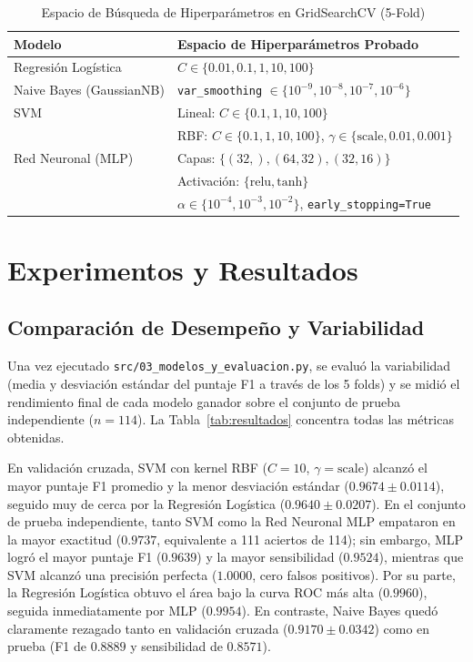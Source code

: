 \documentclass[conference]{IEEEtran}
\begin{document}
\begin{table}[t]
    \centering
    \caption{Espacio de Búsqueda de Hiperparámetros en GridSearchCV (5-Fold)}
    \label{tab:espacio_busqueda}
    \renewcommand{\arraystretch}{1.2}
    \begin{tabular}{@{}p{2.3cm}p{5.7cm}@{}}
        \toprule
        \textbf{Modelo} & \textbf{Espacio de Hiperparámetros Probado} \\
        \midrule
        Regresión Logística & $C \in \{0.01, 0.1, 1, 10, 100\}$ \\
        \addlinespace
        Naive Bayes (GaussianNB) & \texttt{var\_smoothing} $\in \{10^{-9}, 10^{-8}, 10^{-7}, 10^{-6}\}$ \\
        \addlinespace
        SVM & Lineal: $C \in \{0.1, 1, 10, 100\}$ \\
            & RBF: $C \in \{0.1, 1, 10, 100\}$, $\gamma \in \{\text{scale}, 0.01, 0.001\}$ \\
        \addlinespace
        Red Neuronal (MLP) & Capas: $\{(32,), (64,32), (32,16)\}$ \\
                           & Activación: $\{\text{relu}, \text{tanh}\}$ \\
                           & $\alpha \in \{10^{-4}, 10^{-3}, 10^{-2}\}$, \texttt{early\_stopping=True} \\
        \bottomrule
    \end{tabular}
\end{table}

\section{Experimentos y Resultados}

\subsection{Comparación de Desempeño y Variabilidad}

Una vez ejecutado \texttt{src/03\_modelos\_y\_evaluacion.py}, se evaluó la variabilidad (media y desviación estándar del puntaje F1 a través de los 5 folds) y se midió el rendimiento final de cada modelo ganador sobre el conjunto de prueba independiente ($n = 114$). La Tabla~\ref{tab:resultados} concentra todas las métricas obtenidas.

En validación cruzada, SVM con kernel RBF ($C = 10$, $\gamma = \text{scale}$) alcanzó el mayor puntaje F1 promedio y la menor desviación estándar ($0.9674 \pm 0.0114$), seguido muy de cerca por la Regresión Logística ($0.9640 \pm 0.0207$). En el conjunto de prueba independiente, tanto SVM como la Red Neuronal MLP empataron en la mayor exactitud ($0.9737$, equivalente a 111 aciertos de 114); sin embargo, MLP logró el mayor puntaje F1 ($0.9639$) y la mayor sensibilidad ($0.9524$), mientras que SVM alcanzó una precisión perfecta ($1.0000$, cero falsos positivos). Por su parte, la Regresión Logística obtuvo el área bajo la curva ROC más alta ($0.9960$), seguida inmediatamente por MLP ($0.9954$). En contraste, Naive Bayes quedó claramente rezagado tanto en validación cruzada ($0.9170 \pm 0.0342$) como en prueba (F1 de $0.8889$ y sensibilidad de $0.8571$).
\end{document}
